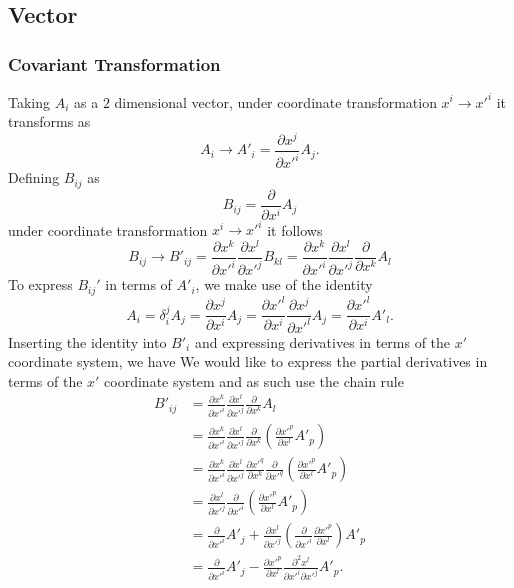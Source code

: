 \documentclass[10pt,letterpaper]{article}
\begin{document}

\subsection{Vector}
\subsubsection*{Covariant Transformation}
Taking $A_i$ as a $2$ dimensional vector, under coordinate transformation $x^i\to x'^i$ it transforms as
\begin{equation}
A_i \to A'_i = \frac{\partial x^j}{\partial x'^i}A_j.
\end{equation}
Defining $B_{ij}$ as 
\begin{equation}
B_{ij} = \frac{\partial}{\partial x^i} A_j
\end{equation}
under coordinate transformation $x^i \to x'^i$ it follows
\begin{equation}
B_{ij} \to B'_{ij} = \frac{\partial x^k}{\partial x'^i} \frac{\partial x^l}{\partial x'^j}B_{kl} =  \frac{\partial x^k}{\partial x'^i} \frac{\partial x^l}{\partial x'^j}
\frac{\partial}{\partial x^k}A_l
\end{equation}
To express $B_{ij}'$ in terms of $A'_i$, we make use of the identity
\begin{equation}
A_i = \delta^j_i A_j = \frac{\partial x^j}{\partial x^i} A_j = \frac{\partial x'^l}{\partial x^i}\frac{\partial x^j}{\partial x'^l} A_j = \frac{\partial x'^l}{\partial x^i}A'_l.
\end{equation}
Inserting the identity into $B'_i$ and expressing derivatives in terms of the $x'$ coordinate system, we have
We would like to express the partial derivatives in terms of the $x'$ coordinate system and as such use the chain rule
\begin{align*}
 B'_{ij} &= \frac{\partial x^k}{\partial x'^i} \frac{\partial x^l}{\partial x'^j}
\frac{\partial}{\partial x^k}A_l\\
 &= \frac{\partial x^k}{\partial x'^i} \frac{\partial x^l}{\partial x'^j}
\frac{\partial}{\partial x^k}\left( \frac{\partial x'^p}{\partial x^l} A'_p\right)\\
&= \frac{\partial x^k}{\partial x'^i} \frac{\partial x^l}{\partial x'^j}
\frac{\partial x'^q}{\partial x^k}\frac{\partial}{\partial x'^q}\left( \frac{\partial x'^p}{\partial x^l} A'_p\right)\\
&= \frac{\partial x^l}{\partial x'^j}
\frac{\partial}{\partial x'^i}\left( \frac{\partial x'^p}{\partial x^l} A'_p\right)\\
&= \frac{\partial}{\partial x'^i}A'_j +  \frac{\partial x^l}{\partial x'^j}\left(\frac{\partial }{\partial x'^i}\frac{\partial x'^p}{\partial x^l}\right) A'_p\\
&= \frac{\partial}{\partial x'^i}A'_j - \frac{\partial x'^p}{\partial x^l} \frac{\partial^2 x^l}{\partial x'^i \partial x'^j} A'_p.
\end{align*}
\end{document}
